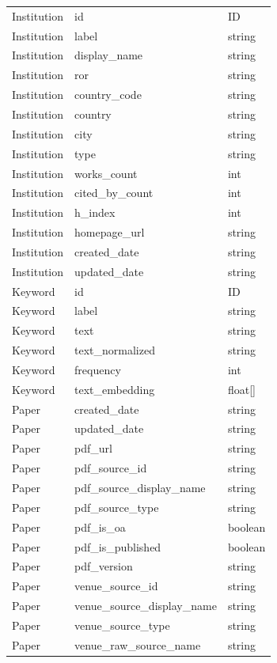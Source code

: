 \begin{longtable}{p{2.8cm}p{5.5cm}p{3cm}}
Institution & id & ID \\
Institution & label & string \\
Institution & display\_name & string \\
Institution & ror & string \\
Institution & country\_code & string \\
Institution & country & string \\
Institution & city & string \\
Institution & type & string \\
Institution & works\_count & int \\
Institution & cited\_by\_count & int \\
Institution & h\_index & int \\
Institution & homepage\_url & string \\
Institution & created\_date & string \\
Institution & updated\_date & string \\

Keyword & id & ID \\
Keyword & label & string \\
Keyword & text & string \\
Keyword & text\_normalized & string \\
Keyword & frequency & int \\
Keyword & text\_embedding & float[] \\

Paper & created\_date & string \\
Paper & updated\_date & string \\
Paper & pdf\_url & string \\
Paper & pdf\_source\_id & string \\
Paper & pdf\_source\_display\_name & string \\
Paper & pdf\_source\_type & string \\
Paper & pdf\_is\_oa & boolean \\
Paper & pdf\_is\_published & boolean \\
Paper & pdf\_version & string \\
Paper & venue\_source\_id & string \\
Paper & venue\_source\_display\_name & string \\
Paper & venue\_source\_type & string \\
Paper & venue\_raw\_source\_name & string \\


\end{longtable}
